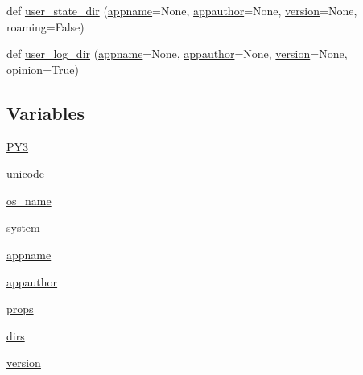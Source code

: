 \begin{DoxyCompactItemize}
\item 
def \hyperlink{namespacepkg__resources_1_1__vendor_1_1appdirs_af56d203eabfadbb69816664209def151}{user\+\_\+state\+\_\+dir} (\hyperlink{namespacepkg__resources_1_1__vendor_1_1appdirs_aa4e000c630ad65c9a27c71e3e40c198b}{appname}=None, \hyperlink{namespacepkg__resources_1_1__vendor_1_1appdirs_a0ecb77f81c567a26dd29b372a769505b}{appauthor}=None, \hyperlink{namespacepkg__resources_1_1__vendor_1_1appdirs_a7a6f6153b945504d785385b95c34369f}{version}=None, roaming=False)
\item 
def \hyperlink{namespacepkg__resources_1_1__vendor_1_1appdirs_ae686d8bb6561d9b02bfa56698f8a390f}{user\+\_\+log\+\_\+dir} (\hyperlink{namespacepkg__resources_1_1__vendor_1_1appdirs_aa4e000c630ad65c9a27c71e3e40c198b}{appname}=None, \hyperlink{namespacepkg__resources_1_1__vendor_1_1appdirs_a0ecb77f81c567a26dd29b372a769505b}{appauthor}=None, \hyperlink{namespacepkg__resources_1_1__vendor_1_1appdirs_a7a6f6153b945504d785385b95c34369f}{version}=None, opinion=True)
\end{DoxyCompactItemize}
\subsection*{Variables}
\begin{DoxyCompactItemize}
\item 
\hyperlink{namespacepkg__resources_1_1__vendor_1_1appdirs_a5c861093fd021acf70d15cb2e2fad19f}{P\+Y3}
\item 
\hyperlink{namespacepkg__resources_1_1__vendor_1_1appdirs_a3414b2343a3f9dd80c1b36f318c1814b}{unicode}
\item 
\hyperlink{namespacepkg__resources_1_1__vendor_1_1appdirs_ab9d5710e6ab8c40420e3f936809374ae}{os\+\_\+name}
\item 
\hyperlink{namespacepkg__resources_1_1__vendor_1_1appdirs_a06279c11087eaa698e4f326e00a30e3e}{system}
\item 
\hyperlink{namespacepkg__resources_1_1__vendor_1_1appdirs_aa4e000c630ad65c9a27c71e3e40c198b}{appname}
\item 
\hyperlink{namespacepkg__resources_1_1__vendor_1_1appdirs_a0ecb77f81c567a26dd29b372a769505b}{appauthor}
\item 
\hyperlink{namespacepkg__resources_1_1__vendor_1_1appdirs_a5fc61bc722a0cf327cd7c30f6b3d840c}{props}
\item 
\hyperlink{namespacepkg__resources_1_1__vendor_1_1appdirs_ab0933b9e5527360f72941b5191b9e17e}{dirs}
\item 
\hyperlink{namespacepkg__resources_1_1__vendor_1_1appdirs_a7a6f6153b945504d785385b95c34369f}{version}
\end{DoxyCompactItemize}


